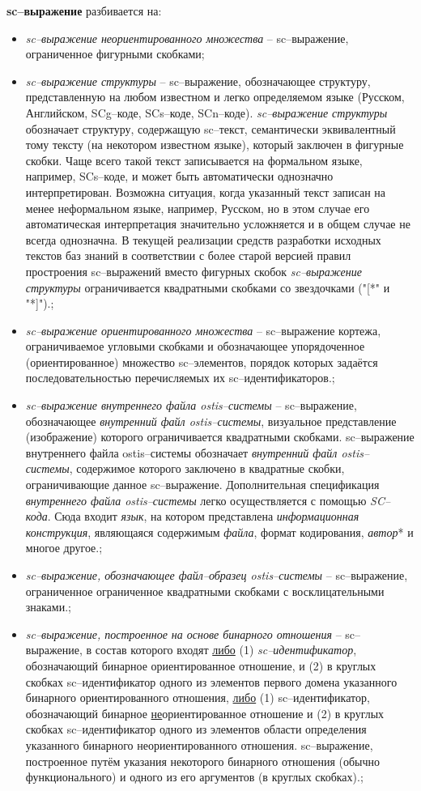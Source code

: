 \textbf{sc--выражение} разбивается на:
\begin{itemize}
	\item{\textit{sc--выражение неориентированного множества} -- sc--выражение, ограниченное фигурными скобками};
	\item{\textit{sc--выражение структуры} -- sc--выражение, обозначающее структуру, представленную на любом известном и легко определяемом языке (Русском, Английском, SCg--коде, SCs--коде, SCn--коде).
	\textit{sc--выражение структуры} обозначает структуру, содержащую sc--текст, семантически эквивалентный тому тексту (на некотором известном языке), который заключен в фигурные скобки. Чаще всего такой текст записывается на формальном языке, например, SCs--коде, и может быть автоматически однозначно интерпретирован. Возможна ситуация, когда указанный текст записан на менее неформальном языке, например, Русском, но в этом случае его автоматическая интерпретация значительно усложняется и в общем случае не всегда однозначна.
	В текущей реализации средств разработки исходных текстов баз знаний в соответствии с более старой версией правил простроения sc--выражений вместо фигурных скобок \textit{sc--выражение структуры} ограничивается квадратными скобками со звездочками ("[*"{} и "*]"{}).};
	\item{\textit{sc--выражение ориентированного множества} -- sc--выражение кортежа, ограничиваемое угловыми скобками и обозначающее упорядоченное (ориентированное) множество sc--элементов, порядок которых задаётся последовательностью перечисляемых их sc--идентификаторов.};
	\item{\textit{sc--выражение внутреннего файла ostis--системы} -- sc--выражение, обозначающее \textit{внутренний файл ostis--системы}, визуальное представление (изображение) которого ограничивается квадратными скобками. sc--выражение внутреннего файла ostis--системы обозначает \textit{внутренний файл ostis--системы}, содержимое которого заключено в квадратные скобки, ограничивающие данное sc--выражение.
	Дополнительная спецификация \textit{внутреннего файла ostis--системы} легко осуществляется с помощью \textit{SC--кода}. Сюда входит \textit{язык}, на котором представлена \textit{информационная конструкция}, являющаяся содержимым \textit{файла}, формат кодирования, \textit{автор}* и многое другое.};
	\item{\textit{sc--выражение, обозначающее файл--образец ostis--системы} -- sc--выражение, ограниченное ограниченное квадратными скобками с восклицательными знаками.};
	\item{\textit{sc--выражение, построенное на основе бинарного отношения} -- sc--выражение, в состав которого входят \uline{либо} (1) \textit{sc--идентификатор}, обозначающий бинарное ориентированное отношение, и (2) в круглых скобках sc--идентификатор одного из элементов первого домена указанного бинарного ориентированного отношения, \uline{либо} (1) sc--идентификатор, обозначающий бинарное \uline{не}ориентированное отношение и (2) в круглых скобках sc--идентификатор одного из элементов области определения указанного бинарного неориентированного отношения. sc--выражение, построенное путём указания некоторого бинарного отношения (обычно функционального) и одного из его аргументов (в круглых скобках).};

\end{itemize}
